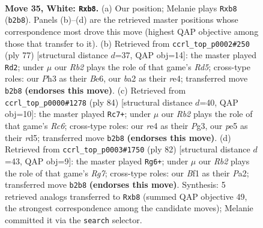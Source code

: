 \documentclass[11pt]{article}
\begin{document}
\clearpage

\begin{figure}[p]\centering
\begin{subfigure}{0.46\textwidth}\centering
\resizebox{\linewidth}{!}{%
\newchessgame
\chessboard[
  setfen={1r6/6k1/8/4p1Bp/4r3/5p1P/bR3P2/5BK1 w - - 0 35},
  showmover=false,
  pgfstyle=straightmove, color=movearrow, markmove={b2-b8}
]}
\caption{}
\end{subfigure}\hfill
\begin{subfigure}{0.46\textwidth}\centering
\resizebox{\linewidth}{!}{%
\newchessgame
\chessboard[
  setfen={8/5pk1/4b3/8/p2rR3/P4B2/1P3P2/6K1 b - - 6 39},
  showmover=false,
  pgfstyle=straightmove, color=movearrow, markmove={d4-d2}
]}
\caption{}
\end{subfigure}
\\[4pt]
\begin{subfigure}{0.46\textwidth}\centering
\resizebox{\linewidth}{!}{%
\newchessgame
\chessboard[
  setfen={8/5k2/2R2b2/3r1p1p/8/2p1B1PP/4KP2/8 w - - 12 43},
  showmover=false,
  pgfstyle=straightmove, color=movearrow, markmove={c6-c7}
]}
\caption{}
\end{subfigure}\hfill
\begin{subfigure}{0.46\textwidth}\centering
\resizebox{\linewidth}{!}{%
\newchessgame
\chessboard[
  setfen={8/3b2R1/3k4/1p5p/4r3/1B2p2P/P3K1P1/8 w - - 3 42},
  showmover=false,
  pgfstyle=straightmove, color=movearrow, markmove={g7-g6}
]}
\caption{}
\end{subfigure}
\caption{\textbf{Move 35, White: \texttt{Rxb8}.} (a) Our position; Melanie plays \texttt{Rxb8} (\texttt{b2b8}). Panels (b)--(d) are the retrieved master positions whose correspondence most drove this move (highest QAP objective among those that transfer to it). (b) Retrieved from \texttt{ccrl\_top\_p0002\#250} (ply 77) [structural distance $d$=37, QAP obj=14]: the master played \texttt{Rd2}; under $\mu$ our \emph{Rb2} plays the role of that game's \emph{Rd5}; cross-type roles: our \emph{P}h3 as their \emph{B}e6, our \emph{b}a2 as their \emph{r}e4; transferred move \texttt{b2b8} \textbf{(endorses this move)}. (c) Retrieved from \texttt{ccrl\_top\_p0000\#1278} (ply 84) [structural distance $d$=40, QAP obj=10]: the master played \texttt{Rc7+}; under $\mu$ our \emph{Rb2} plays the role of that game's \emph{Rc6}; cross-type roles: our \emph{r}e4 as their \emph{P}g3, our \emph{p}e5 as their \emph{r}d5; transferred move \texttt{b2b8} \textbf{(endorses this move)}. (d) Retrieved from \texttt{ccrl\_top\_p0003\#1750} (ply 82) [structural distance $d$=43, QAP obj=9]: the master played \texttt{Rg6+}; under $\mu$ our \emph{Rb2} plays the role of that game's \emph{Rg7}; cross-type roles: our \emph{B}f1 as their \emph{P}a2; transferred move \texttt{b2b8} \textbf{(endorses this move)}. Synthesis: 5 retrieved analogs transferred to \texttt{Rxb8} (summed QAP objective 49, the strongest correspondence among the candidate moves); Melanie committed it via the \texttt{search} selector.}
\label{fig:thought-m68}
\end{figure}
\end{document}
